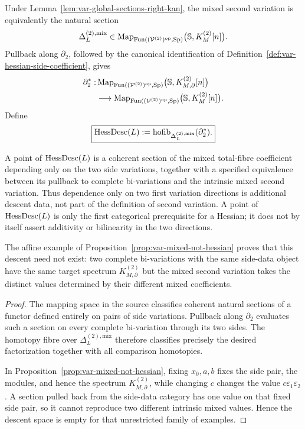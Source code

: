 \begin{definition}
\label{def:var-hessian-descent-space}
Under Lemma~\ref{lem:var-global-sections-right-kan}, the mixed second variation is equivalently the natural section
\[
    \Delta_L^{(2),\mathrm{mix}}
    \in
    \operatorname{Map}_{\operatorname{Fun}((\mathcal V^{(2)})^{\mathrm{op}},\operatorname{Sp})}
    \bigl(\mathbb S,K_M^{(2)}[n]\bigr).
\]
Pullback along \(\partial_2\), followed by the canonical identification of Definition~\ref{def:var-hessian-side-coefficient}, gives
\[
\begin{aligned}
    \partial_2^*:
    &\operatorname{Map}_{\operatorname{Fun}((\mathcal P^{(2)})^{\mathrm{op}},\operatorname{Sp})}
    \bigl(\mathbb S,K^{(2)}_{M,\partial}[n]\bigr)
    \\
    &\longrightarrow
    \operatorname{Map}_{\operatorname{Fun}((\mathcal V^{(2)})^{\mathrm{op}},\operatorname{Sp})}
    \bigl(\mathbb S,K_M^{(2)}[n]\bigr).
\end{aligned}
\]
Define
\[
    \boxed{
    \operatorname{HessDesc}(L)
    :=
    \operatorname{hofib}_{\Delta_L^{(2),\mathrm{mix}}}(\partial_2^*).
    }
\]
\end{definition}

\begin{proposition}
\label{prop:var-hessian-descent-meaning}
A point of \(\operatorname{HessDesc}(L)\) is a coherent section of the mixed total-fibre coefficient depending only on the two side variations, together with a specified equivalence between its pullback to complete bi-variations and the intrinsic mixed second variation. Thus dependence only on two first variation directions is additional descent data, not part of the definition of second variation. A point of \(\operatorname{HessDesc}(L)\) is only the first categorical prerequisite for a Hessian; it does not by itself assert additivity or bilinearity in the two directions.

The affine example of Proposition~\ref{prop:var-mixed-not-hessian} proves that this descent need not exist: two complete bi-variations with the same side-data object have the same target spectrum \(K^{(2)}_{M,\partial}\) but the mixed second variation takes the distinct values determined by their different mixed coefficients.
\end{proposition}

\begin{proof}
The mapping space in the source classifies coherent natural sections of a functor defined entirely on pairs of side variations. Pullback along \(\partial_2\) evaluates such a section on every complete bi-variation through its two sides. The homotopy fibre over \(\Delta_L^{(2),\mathrm{mix}}\) therefore classifies precisely the desired factorization together with all comparison homotopies.

In Proposition~\ref{prop:var-mixed-not-hessian}, fixing \(x_0,a,b\) fixes the side pair, the modules, and hence the spectrum \(K^{(2)}_{M,\partial}\), while changing \(c\) changes the value \(c\varepsilon_1\varepsilon_2\). A section pulled back from the side-data category has one value on that fixed side pair, so it cannot reproduce two different intrinsic mixed values. Hence the descent space is empty for that unrestricted family of examples.
\end{proof}

